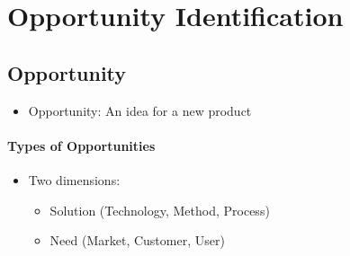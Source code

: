 \documentclass[a4paper,12pt,openany]{book}
\begin{document}
\chapter{Opportunity Identification}
\section{Opportunity}
\begin{itemize}
    \item Opportunity: An idea for a new product
\end{itemize}
\subsubsection{Types of Opportunities}
\begin{itemize}
    \item Two dimensions:
    \begin{itemize}
        \item Solution (Technology, Method, Process)
        \item Need (Market, Customer, User)
    \end{itemize}
\end{itemize}
\end{document}
